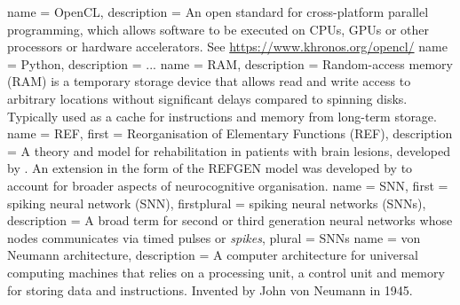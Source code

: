  {
   name = {OpenCL},
   description = {An open standard for cross-platform parallel programming, which
   allows software to be executed on CPUs, GPUs or other processors or hardware accelerators. See \url{
   https://www.khronos.org/opencl/}}
}
 {
  name = Python,
  description = {...}
}
 {
  name = RAM,
  description = {Random-access memory (RAM) is a temporary storage device
	         that allows read and write access to arbitrary locations
		 without significant delays compared to spinning disks.
		 Typically used as a cache for instructions and memory
		 from long-term storage.}
}
 {
  name = REF,
  first = {Reorganisation of Elementary Functions (REF)},
  description = {A theory and model for rehabilitation in patients
  with brain lesions, developed by \cite{Mogensen2011}.
  An extension in the form of the REFGEN model was developed by
  \textcite{Mogensen2017} to account for broader aspects of
  neurocognitive organisation.}
}
 {
  name = SNN,
  first = {spiking neural network (SNN)},
  firstplural = {spiking neural networks (SNNs)},
  description = {A broad term for second or third generation neural
                 networks whose nodes communicates via timed pulses or
		 \textit{spikes}},
  plural = {SNNs}
}
 {
  name = {von Neumann architecture},
  description = {A computer architecture for universal computing machines that
                 relies on a processing unit, a control unit and memory for
		 storing data and instructions. Invented by John von Neumann in
		 1945.}
}
